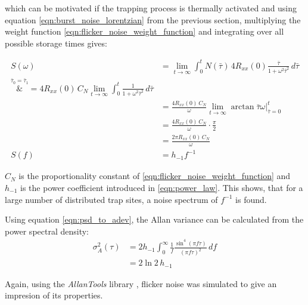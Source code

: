 which can be motivated if the trapping process is thermally activated \cite{1_f_noise_motivation} and using equation \ref{eqn:burst_noise_lorentzian} from the previous section, multiplying the weight function \ref{eqn:flicker_noise_weight_function} and integrating over all possible storage times gives:

\begin{align}
    S(\omega) &= \lim_{t \to \infty} \int_0^t N(\bar \tau) \, 4 R_{xx}(0) \frac{\bar \tau}{1 + \omega^2 \bar \tau^2} \, d\bar\tau \nonumber\\
    \overset{\bar \tau_0 = \bar \tau_1}&{=} 4 R_{xx}(0)\, C_N \lim_{t \to \infty} \int_0^t \frac{1}{1 + \omega^2 \bar\tau^2} \, d\bar\tau \nonumber\\
    &= \frac{4 R_{xx}(0)\, C_N}{\omega} \lim_{t \to \infty}  \arctan{\bar\tau \omega} \Big|_{\bar\tau=0}^t \nonumber\\
    &= \frac{4 R_{xx}(0)\, C_N}{\omega} \cdot \frac{\pi}{2} \nonumber\\
    &= \frac{2 \pi R_{xx}(0)\, C_N}{\omega}\\
    S(f) &= h_{-1} f^{-1}
\end{align}

$C_N$ is the proportionality constant of \ref{eqn:flicker_noise_weight_function} and $h_{-1}$ is the power coefficient introduced in \ref{eqn:power_law}. This shows, that for a large number of distributed trap sites, a noise spectrum of $f^{-1}$ is found.

Using equation \ref{eqn:psd_to_adev}, the Allan variance can be calculated from the power spectral density:
\begin{align}
    \sigma_A^2(\tau) &= 2 h_{-1} \int_0^\infty \frac{1}{f} \frac{\sin^4\left( \pi f \tau \right)}{(\pi f \tau)^2}\,df \nonumber\\
    &=2 \ln 2 \, h_{-1}
\end{align}


Again, using the \textit{AllanTools} library \cite{allantools}, flicker noise was simulated to give an impresion of its properties.

